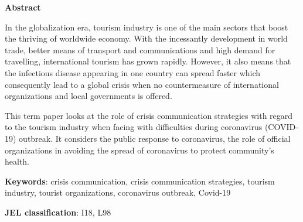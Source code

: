 \thispagestyle{plain}
\textbf{Abstract}

In the globalization era, tourism industry is one of the main sectors that boost the thriving of worldwide economy. With the incessantly development in world trade, better means of transport and communications and high demand for travelling, international tourism has grown rapidly. However, it also means that the infectious disease appearing in one country can spread faster which consequently lead to a global crisis when no countermeasure of international organizations and local governments is offered.

This term paper looks at the role of crisis communication strategies with regard to the tourism industry when facing with difficulties during coronavirus (COVID-19) outbreak. It considers the public response to coronavirus, the role of official organizations in avoiding the spread of coronavirus to protect community’s health.

\vspace{2cm}
\textbf{Keywords}: crisis communication, crisis communication strategies, tourism industry, tourist organizations, coronavirus outbreak, Covid-19

\vspace{1cm}
\textbf{JEL classification}: I18, L98
